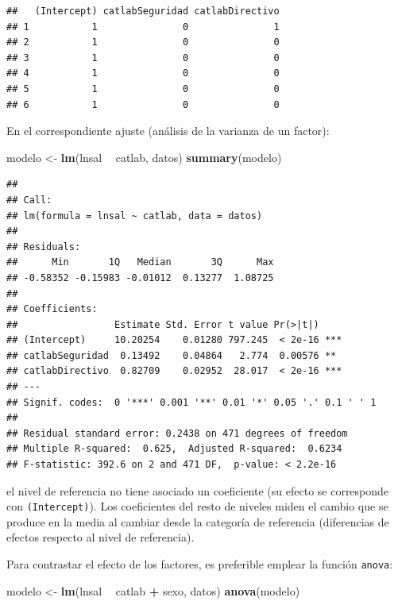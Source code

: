 \documentclass[]{book}
\newenvironment{Shaded}{\begin{snugshade}}{\end{snugshade}}
\newcommand{\KeywordTok}[1]{\textcolor[rgb]{0.13,0.29,0.53}{\textbf{#1}}}
\newcommand{\NormalTok}[1]{#1}
\newcommand{\OperatorTok}[1]{\textcolor[rgb]{0.81,0.36,0.00}{\textbf{#1}}}
\newcommand{\StringTok}[1]{\textcolor[rgb]{0.31,0.60,0.02}{#1}}
\begin{document}
\begin{verbatim}
##   (Intercept) catlabSeguridad catlabDirectivo
## 1           1               0               1
## 2           1               0               0
## 3           1               0               0
## 4           1               0               0
## 5           1               0               0
## 6           1               0               0
\end{verbatim}

En el correspondiente ajuste (análisis de la varianza de un factor):

\begin{Shaded}
\begin{Highlighting}[]
\NormalTok{modelo <-}\StringTok{ }\KeywordTok{lm}\NormalTok{(lnsal }\OperatorTok{~}\StringTok{ }\NormalTok{catlab, datos)}
\KeywordTok{summary}\NormalTok{(modelo)}
\end{Highlighting}
\end{Shaded}

\begin{verbatim}
## 
## Call:
## lm(formula = lnsal ~ catlab, data = datos)
## 
## Residuals:
##      Min       1Q   Median       3Q      Max 
## -0.58352 -0.15983 -0.01012  0.13277  1.08725 
## 
## Coefficients:
##                 Estimate Std. Error t value Pr(>|t|)    
## (Intercept)     10.20254    0.01280 797.245  < 2e-16 ***
## catlabSeguridad  0.13492    0.04864   2.774  0.00576 ** 
## catlabDirectivo  0.82709    0.02952  28.017  < 2e-16 ***
## ---
## Signif. codes:  0 '***' 0.001 '**' 0.01 '*' 0.05 '.' 0.1 ' ' 1
## 
## Residual standard error: 0.2438 on 471 degrees of freedom
## Multiple R-squared:  0.625,  Adjusted R-squared:  0.6234 
## F-statistic: 392.6 on 2 and 471 DF,  p-value: < 2.2e-16
\end{verbatim}

el nivel de referencia no tiene asociado un coeficiente (su efecto se corresponde con \texttt{(Intercept)}). Los coeficientes del resto de niveles miden el cambio que se produce en la media al cambiar desde la categoría de referencia (diferencias de efectos respecto al nivel de referencia).

Para contrastar el efecto de los factores, es preferible emplear la función \texttt{anova}:

\begin{Shaded}
\begin{Highlighting}[]
\NormalTok{modelo <-}\StringTok{ }\KeywordTok{lm}\NormalTok{(lnsal }\OperatorTok{~}\StringTok{ }\NormalTok{catlab }\OperatorTok{+}\StringTok{ }\NormalTok{sexo, datos)}
\KeywordTok{anova}\NormalTok{(modelo)}
\end{Highlighting}
\end{Shaded}
\end{document}
